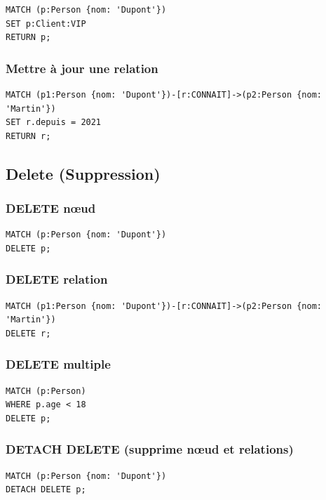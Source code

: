 \documentclass[11pt,a4paper]{article}
\begin{document}
\begin{lstlisting}
MATCH (p:Person {nom: 'Dupont'})
SET p:Client:VIP
RETURN p;
\end{lstlisting}

\subsubsection{Mettre à jour une relation}

\begin{lstlisting}
MATCH (p1:Person {nom: 'Dupont'})-[r:CONNAIT]->(p2:Person {nom: 'Martin'})
SET r.depuis = 2021
RETURN r;
\end{lstlisting}

\subsection{Delete (Suppression)}

\subsubsection{DELETE nœud}

\begin{lstlisting}
MATCH (p:Person {nom: 'Dupont'})
DELETE p;
\end{lstlisting}

\subsubsection{DELETE relation}

\begin{lstlisting}
MATCH (p1:Person {nom: 'Dupont'})-[r:CONNAIT]->(p2:Person {nom: 'Martin'})
DELETE r;
\end{lstlisting}

\subsubsection{DELETE multiple}

\begin{lstlisting}
MATCH (p:Person)
WHERE p.age < 18
DELETE p;
\end{lstlisting}

\subsubsection{DETACH DELETE (supprime nœud et relations)}

\begin{lstlisting}
MATCH (p:Person {nom: 'Dupont'})
DETACH DELETE p;
\end{lstlisting}
\end{document}
